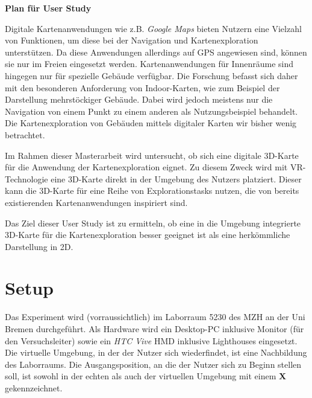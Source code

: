 \documentclass[
    draft=false,
    paper=a4,
    fontsize=11pt,
    twoside=false,
    captions=tableheading,
    british, ngerman,
]{scrartcl}
\begin{document}
\begin{center}
    \LARGE\textsf{\textbf{Plan für User Study}}
\end{center}

\noindent
Digitale Kartenanwendungen wie z.B. \emph{Google Maps} bieten Nutzern eine Vielzahl von Funktionen, um diese bei der Navigation und Kartenexploration unterstützen.
Da diese Anwendungen allerdings auf GPS angewiesen sind, können sie nur im Freien eingesetzt werden.
Kartenanwendungen für Innenräume sind hingegen nur für spezielle Gebäude verfügbar.
Die Forschung befasst sich daher mit den besonderen Anforderung von Indoor-Karten, wie zum Beispiel der Darstellung mehrstöckiger Gebäude.
Dabei wird jedoch meistens nur die Navigation von einem Punkt zu einem anderen als Nutzungsbeispiel behandelt.
Die Kartenexploration von Gebäuden mittels digitaler Karten wir bisher wenig betrachtet.

Im Rahmen dieser Masterarbeit wird untersucht, ob sich eine digitale 3D-Karte für die Anwendung der Kartenexploration eignet.
Zu diesem Zweck wird mit VR-Technologie eine 3D-Karte direkt in der Umgebung des Nutzers platziert.
Dieser kann die 3D-Karte für eine Reihe von Explorationstasks nutzen, die von bereits existierenden Kartenanwendungen inspiriert sind.

Das Ziel dieser User Study ist zu ermitteln, ob eine in die Umgebung integrierte 3D-Karte für die Kartenexploration besser geeignet ist als eine herkömmliche Darstellung in 2D.

\section*{Setup}
Das Experiment wird (vorraussichtlich) im Laborraum 5230 des MZH an der Uni Bremen durchgeführt.
Als Hardware wird ein Desktop-PC inklusive Monitor (für den Versuchsleiter) sowie ein \emph{HTC Vive} HMD inklusive Lighthouses eingesetzt.
Die virtuelle Umgebung, in der der Nutzer sich wiederfindet, ist eine Nachbildung des Laborraums.
Die Ausgangsposition, an die der Nutzer sich zu Beginn stellen soll, ist sowohl in der echten als auch der virtuellen Umgebung mit einem \textbf{X} gekennzeichnet.
\end{document}
